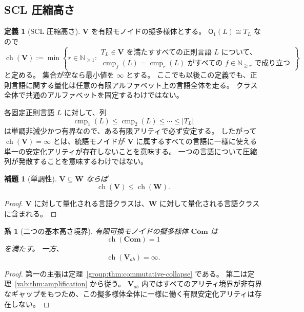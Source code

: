\documentclass[10pt,a4paper]{ltjsarticle}
\newtheorem{lemma}[theorem]{補題}
\newtheorem{corollary}[theorem]{系}
\theoremstyle{definition}
\newtheorem{definition}[theorem]{定義}
\theoremstyle{remark}
\newcommand{\cmp}{\operatorname{cmp}}
\newcommand{\Obj}{\mathsf O}
\begin{document}
\subsection{SCL 圧縮高さ}

\begin{definition}[SCL 圧縮高さ]
\label{ah:def:height}
$\mathbf V$ を有限モノイドの擬多様体とする。
$\Obj_1(L)\cong T_L$ なので
\[
\operatorname{ch}(\mathbf V)
:=
\min\left\{
r\in\mathbb N_{\ge1}:
\begin{array}{l}
T_L\in\mathbf V\text{ を満たすすべての正則言語 }L\text{ について、}\\
\cmp_f(L)=\cmp_r(L)
\text{ がすべての }f\in\mathbb N_{\ge r}\text{ で成り立つ}
\end{array}
\right\}
\]
と定める。
集合が空なら最小値を $\infty$ とする。
ここでも以後この定義でも、正則言語に関する量化は任意の有限アルファベット上の言語全体を走る。
クラス全体で共通のアルファベットを固定するわけではない。
\end{definition}

各固定正則言語 $L$ に対して、列
\[
\cmp_1(L)\le\cmp_2(L)\le\cdots\le|T_L|
\]
は単調非減少かつ有界なので、ある有限アリティで必ず安定する。
したがって $\operatorname{ch}(\mathbf V)=\infty$ とは、統語モノイドが $\mathbf V$ に属するすべての言語に一様に使える単一の安定化アリティが存在しないことを意味する。
一つの言語について圧縮列が発散することを意味するわけではない。

\begin{lemma}[単調性]
\label{ah:lem:monotone}
$\mathbf V\subseteq\mathbf W$ ならば
\[
\operatorname{ch}(\mathbf V)
\le
\operatorname{ch}(\mathbf W).
\]
\end{lemma}

\begin{proof}
$\mathbf V$ に対して量化される言語クラスは、$\mathbf W$ に対して量化される言語クラスに含まれる。
\end{proof}

\begin{corollary}[二つの基本高さ境界]
\label{height:cor:core-bounds}
有限可換モノイドの擬多様体 $\mathbf{Com}$ は
\[
\operatorname{ch}(\mathbf{Com})=1
\]
を満たす。
一方、
\[
\operatorname{ch}(\mathbf V_{ab})=\infty.
\]
\end{corollary}

\begin{proof}
第一の主張は定理~\ref{group:thm:commutative-collapse} である。
第二は定理~\ref{vab:thm:amplification} から従う。
$\mathbf V_{ab}$ 内ではすべてのアリティ境界が非有界なギャップをもつため、この擬多様体全体に一様に働く有限安定化アリティは存在しない。
\end{proof}
\end{document}

